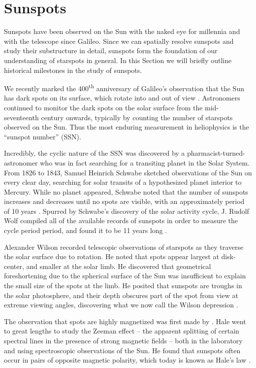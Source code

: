 \section{Sunspots} \label{intro:spots}

Sunspots have been observed on the Sun with the naked eye for millennia and with the telescope since Galileo. Since we can spatially resolve sunspots and study their substructure in detail, sunspots form the foundation of our understanding of starspots in general. In this Section we will briefly outline historical milestones in the study of sunspots.  

We recently marked the 400\textsuperscript{th} anniversary of Galileo's observation that the Sun has dark spots on its surface, which rotate into and out of view \citep{Galilei1613}. Astronomers continued to monitor the dark spots on the solar surface from the mid-seventeenth century onwards, typically by counting the number of starspots observed on the Sun. Thus the most enduring measurement in heliophysics is the ``sunspot number'' (SSN). 

Incredibly, the cyclic nature of the SSN was discovered by a pharmacist-turned-astronomer who was in fact searching for a transiting planet in the Solar System. From 1826 to 1843, Samuel Heinrich Schwabe sketched observations of the Sun on every clear day, searching for solar transits of a hypothesized planet interior to Mercury. While no planet appeared, Schwabe noted that the number of sunspots increases and decreases until no spots are visible, with an approximately period of 10 years \citep{Schwabe1844}. Spurred by Schwabe's discovery of the solar activity cycle, J. Rudolf Wolf compiled all of the available records of sunspots in order to measure the cycle period period, and found it to be 11 years long \citep{Wolf1852}.

Alexander Wilson recorded telescopic observations of starspots as they traverse the solar surface due to rotation. He noted that spots appear largest at disk-center, and smaller at the solar limb. He discovered that geometrical foreshortening due to the spherical surface of the Sun was insufficient to explain the small size of the spots at the limb. He posited that sunspots are troughs in the solar photosphere, and their depth obscures part of the spot from view at extreme viewing angles, discovering what we now call the Wilson depression \citep{Wilson1774}. 

The observation that spots are highly magnetized was first made by \citet{Hale1908}. Hale went to great lengths to study the Zeeman effect -- the apparent splitting of certain spectral lines in the presence of strong magnetic fields -- both in the laboratory and using spectroscopic observations of the Sun. He found that sunspots often occur in pairs of opposite magnetic polarity, which today is known as Hale's law \citep{Hale1925}.

